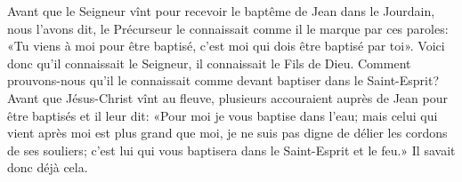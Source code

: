 Avant que le Seigneur vînt pour recevoir le baptême de Jean dans le Jourdain,
	nous l’avons dit, le Précurseur le connaissait
	comme il le marque par ces paroles:
	«Tu viens à moi pour être baptisé, c’est moi qui dois être baptisé par toi».
Voici donc qu’il connaissait le Seigneur, il connaissait le Fils de Dieu.
Comment prouvons-nous qu’il le connaissait
		comme devant baptiser dans le Saint-Esprit?
Avant que Jésus-Christ vînt au fleuve,
	plusieurs accouraient auprès de Jean pour être baptisés
	et il leur dit: «Pour moi je vous baptise dans l’eau;
	mais celui qui vient après moi est plus grand que moi,
	je ne suis pas digne de délier les cordons de ses souliers;
	c’est lui qui vous baptisera dans le Saint-Esprit et le feu.»
Il savait donc déjà cela.
